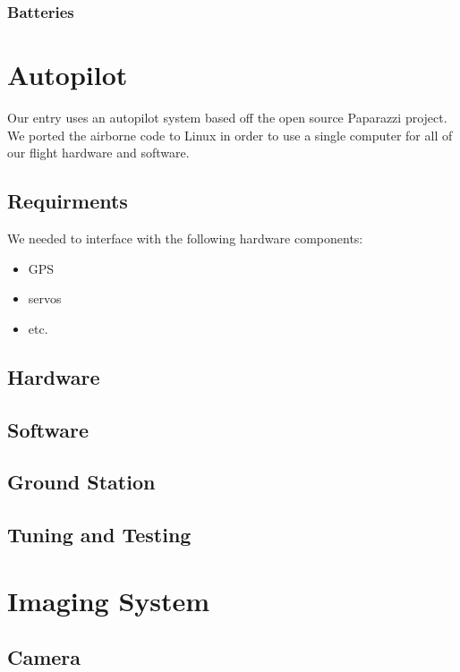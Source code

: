 \documentclass[10pt]{report}
\begin{document}
\subsubsection{Batteries}

\section{Autopilot}
Our entry uses an autopilot system based off the open source 
Paparazzi project\cite{paparazziweb}. 
We ported the airborne code to Linux in order to use a single computer for all of our flight hardware and software.

\subsection{Requirments}

We needed to interface with the following hardware components:
\begin{itemize}
	\item GPS
	\item servos
	\item etc.
\end{itemize}

\subsection{Hardware}

\subsection{Software}

\subsection{Ground Station}

\subsection{Tuning and Testing}

\section{Imaging System}

\subsection{Camera}
\end{document}
